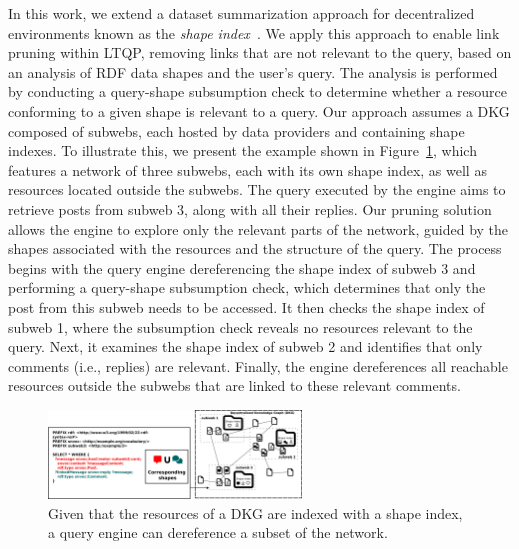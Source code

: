 In this work, we extend a dataset summarization approach for decentralized environments known as the \emph{shape index}~\cite{tam2024opportunitiesshapebasedoptimizationlink}.
We apply this approach to enable link pruning within LTQP, removing links that are not relevant to the query, based on an analysis of RDF data shapes and the user's query.
The analysis is performed by conducting a query-shape subsumption check to determine whether a resource conforming to a given shape is relevant to a query.
Our approach assumes a DKG composed of subwebs, each hosted by data providers and containing shape indexes.  
To illustrate this, we present the example shown in Figure~\ref{fig:dkg}, which features a network of three subwebs, each with its own shape index, as well as resources located outside the subwebs.
The query executed by the engine aims to retrieve posts from subweb 3, along with all their replies.  
Our pruning solution allows the engine to explore only the relevant parts of the network, guided by the shapes associated with the resources and the structure of the query.
The process begins with the query engine dereferencing the shape index of subweb 3 and performing a query-shape subsumption check, which determines that only the post from this subweb needs to be accessed.  
It then checks the shape index of subweb 1, where the subsumption check reveals no resources relevant to the query.  
Next, it examines the shape index of subweb 2 and identifies that only comments (i.e., replies) are relevant.  
Finally, the engine dereferences all reachable resources outside the subwebs that are linked to these relevant comments.

\begin{figure}
   \centering
   \includegraphics[width=0.60\textwidth]{figure/dkg.png}
   \caption{
      Given that the resources of a DKG are indexed with a shape index, a query engine can dereference a subset of the network.
    }
    \label{fig:dkg}
\end{figure}

